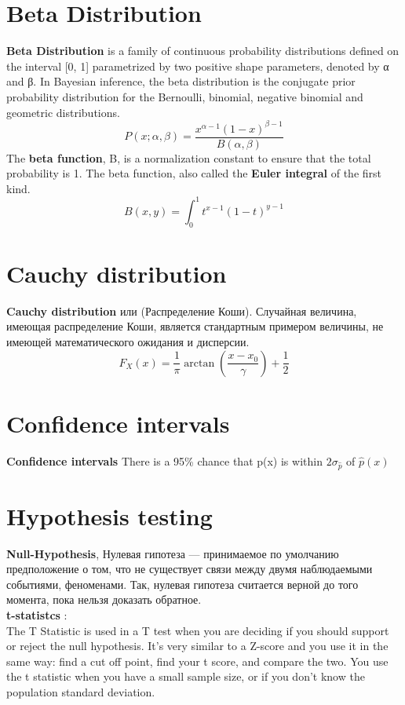 \documentclass{book}
\begin{document}
\section{Beta Distribution}
\textbf{Beta Distribution} is a family of continuous probability distributions defined on the interval [0, 1] parametrized by two positive shape parameters, denoted by α and β. In Bayesian inference, the beta distribution is the conjugate prior probability distribution for the Bernoulli, binomial, negative binomial and geometric distributions.$$P(x; \alpha, \beta)=\frac{x^{\alpha - 1}(1-x)^{\beta -1}}{B(\alpha,\beta)}$$The \textbf{beta function}, 
B, is a normalization constant to ensure that the total probability is 1. The beta function, also called the \textbf{Euler integral} of the first kind. $$B(x, y)=\int_{0}^{1}t^{x-1}(1-t)^{y-1}$$
\section{Cauchy distribution}
\textbf{Cauchy distribution}  или (Распределение Коши). Случайная величина, имеющая распределение Коши, является стандартным примером величины, не имеющей математического ожидания и дисперсии.
$$F_X(x)=\frac{1}{\pi}\arctan \left(\frac{x-x_0}{\gamma}\right) + \frac{1}{2}$$
\section{Confidence intervals}
\textbf{Confidence intervals}
There is a 95\% chance that p(x) is within $2\sigma_{\hat p}$ of $\hat p(x)$


\section{Hypothesis testing}

\textbf{Null-Hypothesis}, Нулевая гипотеза — принимаемое по умолчанию предположение о том, что не существует связи между двумя наблюдаемыми событиями, феноменами. Так, нулевая гипотеза считается верной до того момента, пока нельзя доказать обратное. \\

\textbf{t-statistcs} :\\
The T Statistic is used in a T test when you are deciding if you should support or reject the null hypothesis. It’s very similar to a Z-score and you use it in the same way: find a cut off point, find your t score, and compare the two. You use the t statistic when you have a small sample size, or if you don’t know the population standard deviation.
\end{document}
